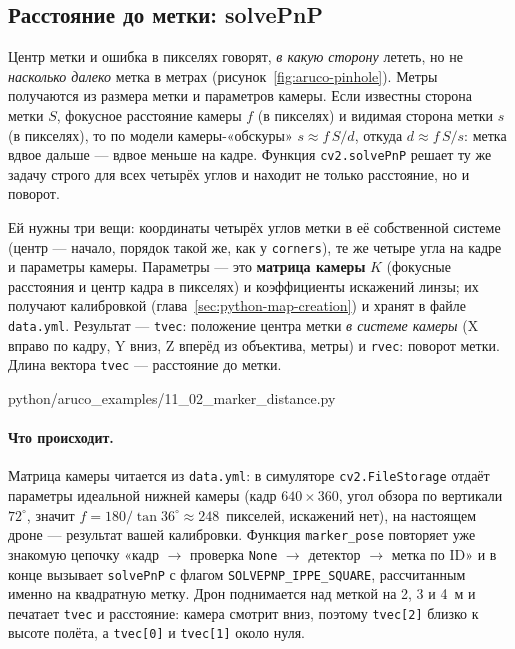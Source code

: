 \subsection{Расстояние до метки: solvePnP}
\label{sec:python-aruco-pose}

Центр метки и ошибка в пикселях говорят, \emph{в какую сторону} лететь, но не \emph{насколько далеко} метка в метрах (рисунок~\ref{fig:aruco-pinhole}). Метры получаются из размера метки и параметров камеры. Если известны сторона метки $S$, фокусное расстояние камеры $f$ (в пикселях) и видимая сторона метки $s$ (в пикселях), то по модели камеры-«обскуры» $s \approx f\,S/d$, откуда $d \approx f\,S/s$: метка вдвое дальше --- вдвое меньше на кадре. Функция \verb|cv2.solvePnP| решает ту же задачу строго для всех четырёх углов и находит не только расстояние, но и поворот.



Ей нужны три вещи: координаты четырёх углов метки в её собственной системе (центр --- начало, порядок такой же, как у \verb|corners|), те же четыре угла на кадре и параметры камеры. Параметры --- это \textbf{матрица камеры} $K$ (фокусные расстояния и центр кадра в пикселях) и коэффициенты искажений линзы; их получают калибровкой (глава~\ref{sec:python-map-creation}) и хранят в файле \texttt{data.yml}. Результат --- \verb|tvec|: положение центра метки \emph{в системе камеры} (X вправо по кадру, Y вниз, Z вперёд из объектива, метры) и \verb|rvec|: поворот метки. Длина вектора \verb|tvec| --- расстояние до метки.

\begin{codefile}[python]{python/aruco_examples/11_02_marker_distance.py}
\end{codefile}

\paragraph{Что происходит.} Матрица камеры читается из \texttt{data.yml}: в симуляторе \verb|cv2.FileStorage| отдаёт параметры идеальной нижней камеры (кадр $640\times360$, угол обзора по вертикали $72^\circ$, значит $f = 180/\tan 36^\circ \approx 248$~пикселей, искажений нет), на настоящем дроне --- результат вашей калибровки. Функция \verb|marker_pose| повторяет уже знакомую цепочку «кадр $\to$ проверка \verb|None| $\to$ детектор $\to$ метка по ID» и в конце вызывает \verb|solvePnP| с флагом \verb|SOLVEPNP_IPPE_SQUARE|, рассчитанным именно на квадратную метку. Дрон поднимается над меткой на 2, 3 и 4~м и печатает \verb|tvec| и расстояние: камера смотрит вниз, поэтому \verb|tvec[2]| близко к высоте полёта, а \verb|tvec[0]| и \verb|tvec[1]| около нуля.

